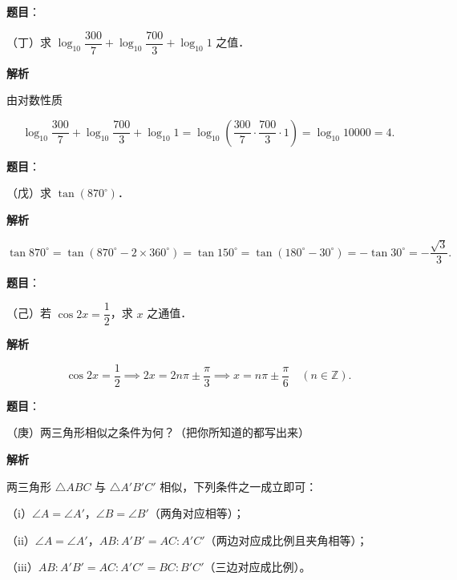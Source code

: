 \begin{answer}

\textbf{题目}：

（丁）求 $\log_{10}\dfrac{300}{7}+\log_{10}\dfrac{700}{3}+\log_{10}1$ 之值．

\textbf{解析}

由对数性质

\nopagebreak[4]
\[
\log_{10}\frac{300}{7}+\log_{10}\frac{700}{3}+\log_{10}1
=\log_{10}\left(\frac{300}{7}\cdot\frac{700}{3}\cdot1\right)
=\log_{10}10000=4.
\]


\end{answer}
\begin{answer}

\textbf{题目}：

（戊）求 $\tan(870^\circ)$．

\textbf{解析}

\nopagebreak[4]
\[
\tan870^\circ=\tan(870^\circ-2\times360^\circ)=\tan150^\circ
=\tan(180^\circ-30^\circ)=-\tan30^\circ=-\frac{\sqrt3}{3}.
\]


\end{answer}
\begin{answer}

\textbf{题目}：

（己）若 $\cos2x=\dfrac12$，求 $x$ 之通值．

\textbf{解析}

\nopagebreak[4]
\[
\cos2x=\frac12\implies 2x=2n\pi\pm\frac\pi3\implies x=n\pi\pm\frac\pi6\quad(n\in\mathbb Z).
\]


\end{answer}
\begin{answer}

\textbf{题目}：

（庚）两三角形相似之条件为何？（把你所知道的都写出来）

\textbf{解析}

两三角形 $\triangle ABC$ 与 $\triangle A'B'C'$ 相似，下列条件之一成立即可：

（i）$\angle A=\angle A'$，$\angle B=\angle B'$（两角对应相等）；

（ii）$\angle A=\angle A'$，$AB:A'B'=AC:A'C'$（两边对应成比例且夹角相等）；

（iii）$AB:A'B'=AC:A'C'=BC:B'C'$（三边对应成比例）。


\end{answer}
